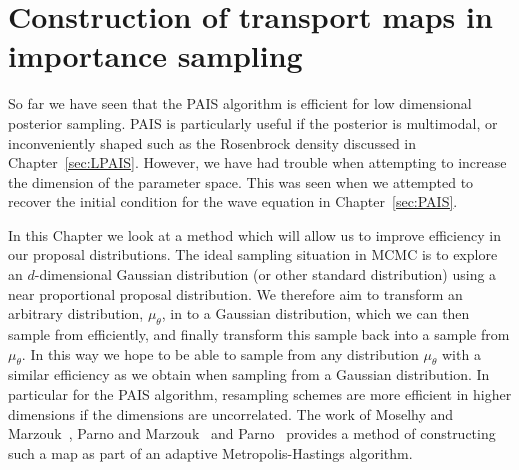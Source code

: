 \documentclass[final]{siamltex}
\begin{document}
\section{Construction of transport maps in importance sampling} \label{sec:map}

So far we have seen that the PAIS algorithm is efficient for low dimensional posterior sampling.
PAIS is particularly useful if the posterior is multimodal, or inconveniently shaped such as the
Rosenbrock density discussed in Chapter~\ref{sec:LPAIS}. However, we have had trouble when
attempting to increase the dimension of the parameter space. This was seen when we attempted to
recover the initial condition for the wave equation in Chapter~\ref{sec:PAIS}.

In this Chapter we look at a method which will allow us to improve efficiency in our proposal distributions. The ideal sampling
situation in MCMC is to explore an $d$-dimensional Gaussian distribution (or other standard distribution) using a near proportional
proposal distribution. We therefore aim to transform an arbitrary distribution, $\mu_\theta$, in to a Gaussian distribution, which we can then sample from efficiently, and finally transform this sample back into a sample from $\mu_\theta$. In this way we hope to be able to sample from any distribution $\mu_\theta$ with a similar efficiency as we obtain when sampling from a Gaussian distribution. In particular for the PAIS algorithm, resampling schemes are more efficient in higher
dimensions if the dimensions are uncorrelated. The work of Moselhy and
Marzouk~\cite{el2012bayesian}, Parno and Marzouk~\cite{parno2014transport} and
Parno~\cite{parno2015transport} provides a method of constructing such a map as part of an adaptive
Metropolis-Hastings algorithm.
\end{document}
